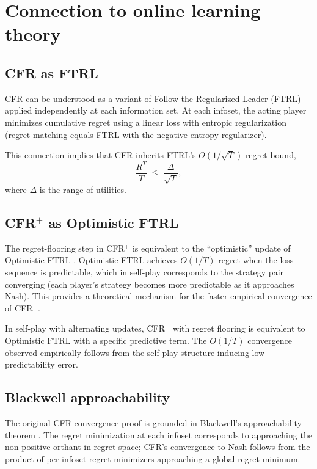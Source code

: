 \section{Connection to online learning theory}
\label{sec:ol}

\subsection{CFR as FTRL}

CFR can be understood as a variant of Follow-the-Regularized-Leader (FTRL)
applied independently at each information set. At each infoset, the acting
player minimizes cumulative regret using a linear loss with entropic
regularization (regret matching equals FTRL with the negative-entropy
regularizer).

This connection implies that CFR inherits FTRL's $O(1/\sqrt{T})$ regret
bound,
\[
  \frac{R^T}{T} \;\leq\; \frac{\Delta}{\sqrt{T}},
\]
where $\Delta$ is the range of utilities.

\subsection{CFR$^+$ as Optimistic FTRL}

The regret-flooring step in CFR$^+$ is equivalent to the ``optimistic''
update of Optimistic FTRL \citep{rakhlin2013optimistic}. Optimistic FTRL
achieves $O(1/T)$ regret when the loss sequence is predictable, which in
self-play corresponds to the strategy pair converging (each player's
strategy becomes more predictable as it approaches Nash). This provides a
theoretical mechanism for the faster empirical convergence of CFR$^+$.

\begin{proposition}
In self-play with alternating updates, CFR$^+$ with regret flooring is
equivalent to Optimistic FTRL with a specific predictive term. The $O(1/T)$
convergence observed empirically follows from the self-play structure
inducing low predictability error.
\end{proposition}

\subsection{Blackwell approachability}

The original CFR convergence proof \citep{zinkevich2007} is grounded in
Blackwell's approachability theorem \citep{blackwell1956analog}. The regret
minimization at each infoset corresponds to approaching the non-positive
orthant in regret space; CFR's convergence to Nash follows from the product
of per-infoset regret minimizers approaching a global regret minimum.

